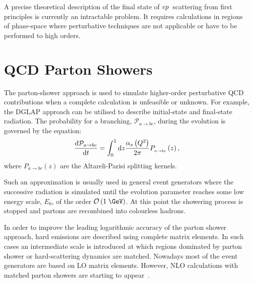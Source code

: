 A precise theoretical description of the final state of $\mbox{$e p$}$~scattering from first principles is currently an intractable problem. It requires calculations in regions of phase-space where perturbative techniques are not applicable or have to be performed to high orders.
\section{QCD Parton Showers}
\label{sec:qcdpartonshower}
The parton-shower approach is used to simulate higher-order perturbative QCD contributions when a complete calculation is unfeasible or unknown. For example, the DGLAP approach can be utilised to describe initial-state and final-state radiation. The probability for a branching, $\mathcal{P}_{a\rightarrow bc}$, during the evolution is governed by the equation:
\begin{equation}
\frac{\mathrm{d}\mathcal{P}_{a\rightarrow bc}}{\mathrm{d}t} = \int_0^1{\mathrm{d}z\frac{\mbox{$\alpha_{s}$}\left(\mbox{${Q^2}$}\right)}{2\pi}P_{_{a\rightarrow bc}}}\left(z\right),
\end{equation}
where $P_{a\rightarrow bc}\left(z\right)$ are the Altareli-Parisi splitting kernels.

Such an approximation is usually used in general event generators where the successive radiation is simulated until the evolution parameter reaches some low energy scale, $E_0$, of the order $\mathcal{O}\left(1\;\GeV\right)$. At this point the showering process is stopped and partons are recombined into colourless hadrons.

In order to improve the leading logarithmic accuracy of the parton shower approach, hard emissions are described using complete matrix elements. In such cases an intermediate scale is introduced at which regions dominated by parton shower or hard-scattering dynamics are matched. Nowadays most of the event generators are based on LO matrix elements. However, NLO calculations with matched parton showers are starting to appear~\cite{powheg, mcatnlo}.

